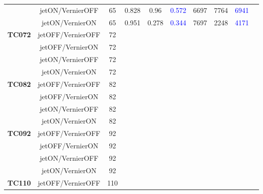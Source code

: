 \documentclass[12pt]{article}
\begin{document}
\begin{table}[H]
{\begin{tabular}{|c|c|c|c|c|c|c|c|c|c|}
                       & jetON/VernierOFF  & 65 & 0.828 & 0.96  & \textcolor{blue}{0.572} & 6697 & 7764 & \textcolor{blue}{6941}   \\ \cline{2-9}
                       & jetON/VernierON  & 65 & 0.951 & 0.278 & \textcolor{blue}{0.344} & 7697 & 2248 & \textcolor{blue}{4171} \\ \hline \hline
%                        
\multirow{4}{*}{\textbf{TC072}} & jetOFF/VernierOFF & 72 & & & & & & \\ \cline{2-9}
                                & jetOFF/VernierON  & 72 & & & & & & \\ \cline{2-9}
                                & jetON/VernierOFF  & 72 & & & & & & \\ \cline{2-9}
                                & jetON/VernierON   & 72 & & & & & & \\ \hline \hline
%                        
\multirow{4}{*}{\textbf{TC082}} & jetOFF/VernierOFF & 82 & & & & & & \\ \cline{2-9}
                                & jetOFF/VernierON  & 82 & & & & & & \\ \cline{2-9}
                                & jetON/VernierOFF  & 82 & & & & & & \\ \cline{2-9}
                                & jetON/VernierON   & 82 & & & & & & \\ \hline \hline
%                        
\multirow{4}{*}{\textbf{TC092}} & jetOFF/VernierOFF & 92 & & & & & & \\ \cline{2-9}
                                & jetOFF/VernierON  & 92 & & & & & & \\ \cline{2-9}
                                & jetON/VernierOFF  & 92 & & & & & & \\ \cline{2-9}
                                & jetON/VernierON   & 92 & & & & & & \\ \hline \hline
%                        
\multirow{4}{*}{\textbf{TC110}} & jetOFF/VernierOFF & 110 & & & & & & \\ \cline{2-9}

\end{tabular}}
\end{table}
\end{document}
